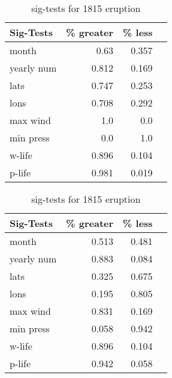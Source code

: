 \documentclass[smallextended]{svjour3}       %
\begin{document}
\begin{table}[!tbp]
\centering
\begin{minipage}[b]{0.45\textwidth}
\begin{tabular}{lrrr}
\toprule
             Sig-Tests & \% greater &  \% less \\

\midrule

month & 0.63 & 0.357 \\
yearly num & 0.812 & 0.169 \\
lats & 0.747 & 0.253 \\
lons & 0.708 & 0.292 \\
max wind & 1.0 & 0.0 \\
min press & 0.0 & 1.0 \\
w-life & 0.896 & 0.104 \\
p-life & 0.981 & 0.019 \\

\bottomrule
\end{tabular}
\caption{sig-tests for 1213 eruption}
\label{sig_1213}
\end{minipage}
\hfill
\begin{minipage}[b]{0.45\textwidth}
\begin{tabular}{lrrr}
\toprule
             Sig-Tests & \% greater &  \% less \\
\midrule

month & 0.513 & 0.481 \\
yearly num & 0.883 & 0.084 \\
lats & 0.325 & 0.675 \\
lons & 0.195 & 0.805 \\
max wind & 0.831 & 0.169 \\
min press & 0.058 & 0.942 \\
w-life & 0.896 & 0.104 \\
p-life & 0.942 & 0.058 \\

\bottomrule
\end{tabular}
\caption{sig-tests for 1815 eruption}
\label{sig_1815}
\end{minipage}
\end{table}
\end{document}
